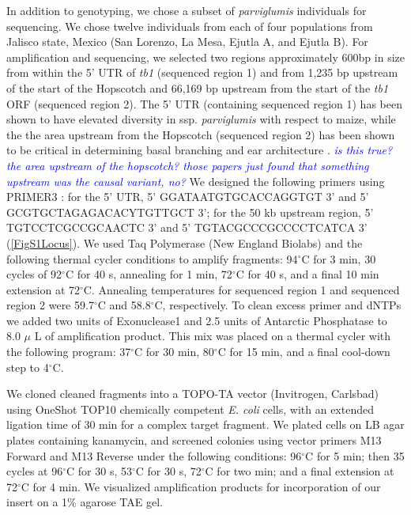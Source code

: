 \documentclass[12pt]{article}
\newcommand{\jri}[1]{\textcolor{blue}{ \emph{\scriptsize  #1}} }
\begin{document}
In addition to genotyping, we chose a subset of \emph{parviglumis} individuals for sequencing. We chose twelve individuals from each of four populations from Jalisco state, Mexico (San Lorenzo, La Mesa, Ejutla A, and Ejutla B). For amplification and sequencing, we selected two regions approximately 600bp in size from within the 5' UTR of \emph{tb1} (sequenced region 1) and from 1,235 bp upstream of the start of the Hopscotch and 66,169 bp upstream from the start of the \emph{tb1} ORF (sequenced region 2). The 5' UTR (containing sequenced region 1) has been shown to have elevated diversity in ssp. \emph{parviglumis} with respect to maize, while the the area upstream from the Hopscotch (sequenced region 2) has been shown to be critical in determining basal branching and ear architecture \citep{Wang1999, Clark2006}. \jri{is this true? the area upstream of the hopscotch? those papers just found that something upstream was the causal variant, no?} We designed the following primers using PRIMER3 \citep{RozenSkaletsky2000}: for the 5' UTR, {\small 5' GGATAATGTGCACCAGGTGT 3'} and {\small 5' GCGTGCTAGAGACACYTGTTGCT 3'}; for the 50 kb upstream region, {\small 5' TGTCCTCGCCGCAACTC 3'} and {5' TGTACGCCCGCCCCTCATCA 3'} (\ref{FigS1Locus}). We used Taq Polymerase (New England Biolabs) and the following thermal cycler conditions to amplify fragments: 94$^{\circ}$C for 3 min, 30 cycles of 92$^{\circ}$C for 40 s, annealing for 1 min, 72$^{\circ}$C for 40 s, and a final 10 min extension at 72$^{\circ}$C. Annealing temperatures for sequenced region 1 and sequenced region 2 were 59.7$^{\circ}$C and 58.8$^{\circ}$C, respectively. To clean excess primer and dNTPs we added two units of Exonuclease1 and 2.5 units of Antarctic Phosphatase to 8.0 $\mu$ L of amplification product. This mix was placed on a thermal cycler with the following program: 37$^{\circ}$C for 30 min, 80$^{\circ}$C for 15 min, and a final cool-down step to 4$^{\circ}$C. 

We cloned cleaned fragments into a TOPO-TA vector (Invitrogen, Carlsbad) using OneShot TOP10 chemically competent \emph{E. coli} cells, with an extended ligation time of 30 min for a complex target fragment. We plated cells on LB agar plates containing kanamycin, and screened colonies using vector primers M13 Forward and M13 Reverse under the following conditions: 96$^{\circ}$C for 5 min; then 35 cycles at 96$^{\circ}$C for 30 s, 53$^{\circ}$C for 30 s, 72$^{\circ}$C for two min; and a final extension at 72$^{\circ}$C for 4 min. We visualized amplification products for incorporation of our insert on a 1\% agarose TAE gel.
\end{document}
